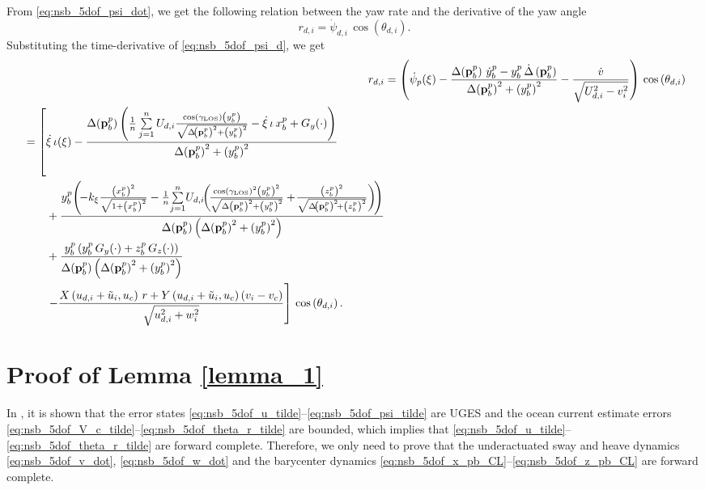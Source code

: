 From \eqref{eq:nsb_5dof_psi_dot}, we get the following relation between the yaw rate and the derivative of the yaw angle
\begin{equation}
    r_{d,i} = \dot{\psi}_{d,i}\,\cos\left(\theta_{d,i}\right).
\end{equation}
Substituting the time-derivative of \eqref{eq:nsb_5dof_psi_d}, we get
\begin{subequations}
    \begin{align}
        r_{d,i} &= \left(\dot{\psi}_p(\xi) - \frac{\Delta\!\left(\mat{p}_b^p\right)\,\dot{y}_b^p - y_b^p\,\dot{\Delta}\left(\mat{p}_b^p\right)}{\Delta\!\left(\mat{p}_b^p\right)^2 + \left(y_b^p\right)^2} - \frac{\dot{v}}{\sqrt{U_{d,i}^2 - v_i^2}}\right)\,\cos\left(\theta_{d,i}\right) \\
        \begin{split}
            &= \left[\dot{\xi}\,\iota(\xi) - \frac{\Delta\!\left(\mat{p}_b^p\right)\left(\frac{1}{n} \sum\limits_{j=1}^n U_{d,i}\frac{\cos\left(\gamma_{\rm LOS}\right)\left(y_b^p\right)}{\sqrt{\Delta\!\left(\mat{p}_b^p\right)^2 + \left(y_b^p\right)^2}} - \dot{\xi}\,\iota\,x_b^p + G_y(\cdot)\right)}{\Delta\!\left(\mat{p}_b^p\right)^2 + \left(y_b^p\right)^2} \right. \\
            &\qquad + \frac{y_b^p\!\left(\!-k_{\xi}\frac{\left(x_b^p\right)^2}{\sqrt{1+\left(x_b^p\right)^2}} - \frac{1}{n}\!\sum\limits_{j=1}^n\! U_{d,i}\!\!\left(\!\scale[1]{\frac{\cos\left(\gamma_{\rm LOS}\right)^2\left(y_b^p\right)^2}{\sqrt{\Delta\left(\mat{p}_b^p\right)^2 + \left(y_b^p\right)^2}}} +\! \frac{\left(z_b^p\right)^2}{\sqrt{\Delta\!\left(\mat{p}_b^p\right)^2\! + \left(z_b^p\right)^2}}\right)\!\right)}{\Delta\!\left(\mat{p}_b^p\right)\left(\Delta\!\left(\mat{p}_b^p\right)^2 + \left(y_b^p\right)^2\right)} \\
            &\qquad + \frac{y_b^p \left(y_b^p\,G_y(\cdot) + z_b^p\,G_z(\cdot)\right)}{\Delta\!\left(\mat{p}_b^p\right)\left(\Delta\!\left(\mat{p}_b^p\right)^2 + \left(y_b^p\right)^2\right)} \\
            &\qquad \left. -\frac{X\left(u_{d,i}+\tilde{u}_i, u_c\right)\,r + Y\left(u_{d,i}+\tilde{u}_i, u_c\right)\left(v_i - v_c\right)}{\sqrt{u_{d,i}^2 + w_i^2}} \right]\, \cos\left(\theta_{d,i}\right).
        \end{split}
    \end{align} \label{eq:nsb_5dof_r_d}
\end{subequations}

\section{Proof of Lemma \ref{lemma_1}}
\label{app:5dof_nsb_lemma_1}
In \cite{moe_LOS_2016}, it is shown that the error states \eqref{eq:nsb_5dof_u_tilde}--\eqref{eq:nsb_5dof_psi_tilde} are UGES and the ocean current estimate errors \eqref{eq:nsb_5dof_V_c_tilde}--\eqref{eq:nsb_5dof_theta_r_tilde} are bounded, which implies that \eqref{eq:nsb_5dof_u_tilde}--\eqref{eq:nsb_5dof_theta_r_tilde} are forward complete.
Therefore, we only need to prove that the underactuated sway and heave dynamics \eqref{eq:nsb_5dof_v_dot}, \eqref{eq:nsb_5dof_w_dot} and the barycenter dynamics \eqref{eq:nsb_5dof_x_pb_CL}--\eqref{eq:nsb_5dof_z_pb_CL} are forward complete.

